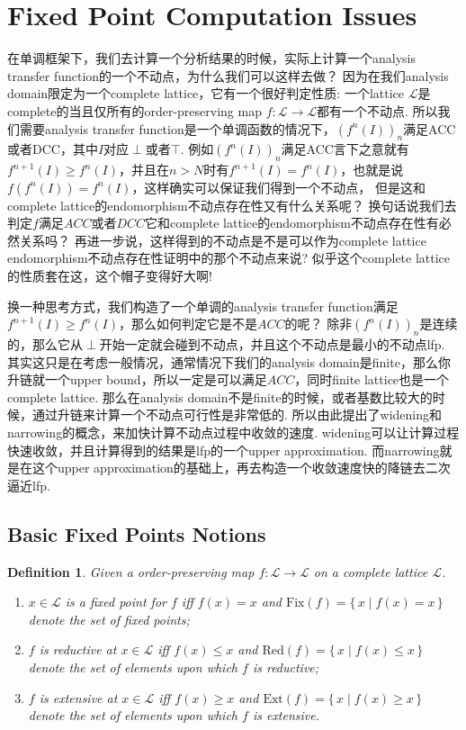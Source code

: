 \documentclass{article}
\newtheorem{definition}[theorem]{Definition}
\newcommand*{\xfunc}[4]{{#2}\colon{#3}{#1}{#4}}
\newcommand*{\func}[3]{\xfunc{\to}{#1}{#2}{#3}}
\newcommand\Set[2]{\{\,#1\mid#2\,\}} %
\begin{document}
\newpage
\section{Fixed Point Computation Issues}

在单调框架下，我们去计算一个分析结果的时候，实际上计算一个analysis transfer function的一个不动点，为什么我们可以这样去做？ 因为在我们analysis domain限定为一个complete lattice，它有一个很好判定性质: {\color{red}一个lattice $\mathcal{L}$是complete的当且仅所有的order-preserving map $\func{f}{\mathcal{L}}{\mathcal{L}}$都有一个不动点}. 所以我们需要analysis transfer function是一个单调函数的情况下，$(f^n(I))_n$满足ACC或者DCC，其中$I$对应$\perp$或者$\top$. 例如$(f^n(I))_n$满足ACC言下之意就有$f^{n+1}(I) \geq f^n(I)$，并且在$n > N$时有$f^{n+1}(I) = f^n(I)$，也就是说$f(f^n(I)) = f^n(I)$，这样确实可以保证我们得到一个不动点，{\color{blue} 但是这和complete lattice的endomorphism不动点存在性又有什么关系呢？} 换句话说我们去判定$f$满足$ACC$或者$DCC$它和complete lattice的endomorphism不动点存在性有必然关系吗？ 再进一步说，这样得到的不动点是不是可以作为complete lattice endomorphism不动点存在性证明中的那个不动点来说? 似乎这个complete lattice的性质套在这，这个帽子变得好大啊!

换一种思考方式，我们构造了一个单调的analysis transfer function满足$f^{n+1}(I) \geq f^n(I)$，那么如何判定它是不是$ACC$的呢？ 除非$(f^n(I))_n$是连续的，那么它从$\perp$开始一定就会碰到不动点，并且这个不动点是最小的不动点lfp. 其实这只是在考虑一般情况，通常情况下我们的analysis domain是finite，那么你升链就一个upper bound，所以一定是可以满足$ACC$，同时finite lattice也是一个complete lattice. 那么在analysis domain不是finite的时候，或者基数比较大的时候，通过升链来计算一个不动点可行性是非常低的. {\color{red}所以由此提出了widening和narrowing的概念，来加快计算不动点过程中收敛的速度}. widening可以让计算过程快速收敛，并且计算得到的结果是lfp的一个upper approximation. 而narrowing就是在这个upper approximation的基础上，再去构造一个收敛速度快的降链去二次逼近lfp.

\newpage
\subsection{Basic Fixed Points Notions}

\begin{definition}
\rm Given a order-preserving map $\func{f}{\mathcal{L}}{\mathcal{L}}$ on a complete lattice $\mathcal{L}$. 
\begin{enumerate}
	\item $x \in \mathcal{L}$ is a {\color{red} fixed point} for $f$ iff $f(x) = x$ and $\text{Fix}(f) = \Set{x}{f(x) = x}$ denote the set of fixed points;
	\item $f$ is {\color{red} reductive} at $x \in \mathcal{L}$ iff $f(x) \leq x$ and $\text{Red}(f) = \Set{x}{f(x) \leq x}$ denote the set of elements upon which $f$ is reductive;
	\item $f$ is {\color{red} extensive} at $x \in \mathcal{L}$ iff $f(x) \geq x$ and $\text{Ext}(f) = \Set{x}{f(x) \geq x}$ denote the set of elements upon which $f$ is extensive.
\end{enumerate}
\end{definition}
\end{document}
